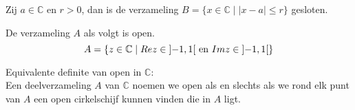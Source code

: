 \documentclass[main.tex]{subfiles}
\begin{document}
\begin{vb}
  Zij $a\in \mathbb{C}$ en $r>0$, dan is de verzameling $B = \{x\in \mathbb{C}\mid |x-a|\le r\}$ gesloten.

\end{vb}

\begin{vb}
  De verzameling $A$ als volgt is open.
  \[ A = \left\{z \in \mathbb{C} \mid Re z \in \interval[open]{-1}{1} \text{ en } Im z \in \interval[open]{-1}{1} \right\} \]

\end{vb}

\begin{st}
  Equivalente definite van open in $\mathbb{C}$:\\
  Een deelverzameling $A$ van $\mathbb{C}$ noemen we open als en slechts als we rond elk punt van $A$ een open cirkelschijf kunnen vinden die in $A$ ligt.
\end{st}

\end{document}
